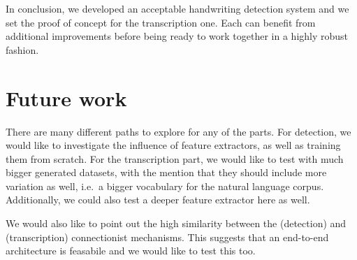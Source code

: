In conclusion, we developed an acceptable handwriting detection system and we set the proof of concept for the transcription one. Each can benefit from additional improvements before being ready to work together in a highly robust fashion.

\section{Future work}
There are many different paths to explore for any of the parts. For detection, we would like to investigate the influence of feature extractors, as well as training them from scratch. For the transcription part, we would like to test with much bigger generated datasets, with the mention that they should include more variation as well, i.e.\ a bigger vocabulary for the natural language corpus. Additionally, we could also test a deeper feature extractor here as well.

We would also like to point out the high similarity between the \CTPN{} (detection) and \CRNN{} (transcription) connectionist mechanisms. This suggests that an end-to-end architecture is feasabile and we would like to test this too.

